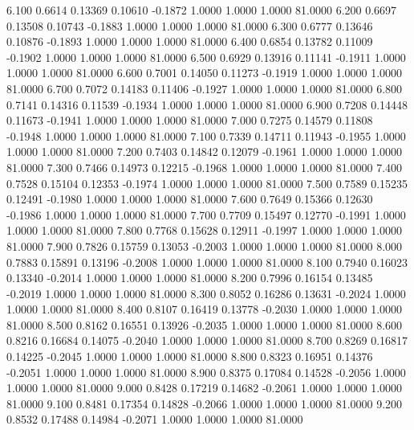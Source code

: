    6.100   0.6614   0.13369   0.10610  -0.1872   1.0000   1.0000   1.0000  81.0000
   6.200   0.6697   0.13508   0.10743  -0.1883   1.0000   1.0000   1.0000  81.0000
   6.300   0.6777   0.13646   0.10876  -0.1893   1.0000   1.0000   1.0000  81.0000
   6.400   0.6854   0.13782   0.11009  -0.1902   1.0000   1.0000   1.0000  81.0000
   6.500   0.6929   0.13916   0.11141  -0.1911   1.0000   1.0000   1.0000  81.0000
   6.600   0.7001   0.14050   0.11273  -0.1919   1.0000   1.0000   1.0000  81.0000
   6.700   0.7072   0.14183   0.11406  -0.1927   1.0000   1.0000   1.0000  81.0000
   6.800   0.7141   0.14316   0.11539  -0.1934   1.0000   1.0000   1.0000  81.0000
   6.900   0.7208   0.14448   0.11673  -0.1941   1.0000   1.0000   1.0000  81.0000
   7.000   0.7275   0.14579   0.11808  -0.1948   1.0000   1.0000   1.0000  81.0000
   7.100   0.7339   0.14711   0.11943  -0.1955   1.0000   1.0000   1.0000  81.0000
   7.200   0.7403   0.14842   0.12079  -0.1961   1.0000   1.0000   1.0000  81.0000
   7.300   0.7466   0.14973   0.12215  -0.1968   1.0000   1.0000   1.0000  81.0000
   7.400   0.7528   0.15104   0.12353  -0.1974   1.0000   1.0000   1.0000  81.0000
   7.500   0.7589   0.15235   0.12491  -0.1980   1.0000   1.0000   1.0000  81.0000
   7.600   0.7649   0.15366   0.12630  -0.1986   1.0000   1.0000   1.0000  81.0000
   7.700   0.7709   0.15497   0.12770  -0.1991   1.0000   1.0000   1.0000  81.0000
   7.800   0.7768   0.15628   0.12911  -0.1997   1.0000   1.0000   1.0000  81.0000
   7.900   0.7826   0.15759   0.13053  -0.2003   1.0000   1.0000   1.0000  81.0000
   8.000   0.7883   0.15891   0.13196  -0.2008   1.0000   1.0000   1.0000  81.0000
   8.100   0.7940   0.16023   0.13340  -0.2014   1.0000   1.0000   1.0000  81.0000
   8.200   0.7996   0.16154   0.13485  -0.2019   1.0000   1.0000   1.0000  81.0000
   8.300   0.8052   0.16286   0.13631  -0.2024   1.0000   1.0000   1.0000  81.0000
   8.400   0.8107   0.16419   0.13778  -0.2030   1.0000   1.0000   1.0000  81.0000
   8.500   0.8162   0.16551   0.13926  -0.2035   1.0000   1.0000   1.0000  81.0000
   8.600   0.8216   0.16684   0.14075  -0.2040   1.0000   1.0000   1.0000  81.0000
   8.700   0.8269   0.16817   0.14225  -0.2045   1.0000   1.0000   1.0000  81.0000
   8.800   0.8323   0.16951   0.14376  -0.2051   1.0000   1.0000   1.0000  81.0000
   8.900   0.8375   0.17084   0.14528  -0.2056   1.0000   1.0000   1.0000  81.0000
   9.000   0.8428   0.17219   0.14682  -0.2061   1.0000   1.0000   1.0000  81.0000
   9.100   0.8481   0.17354   0.14828  -0.2066   1.0000   1.0000   1.0000  81.0000
   9.200   0.8532   0.17488   0.14984  -0.2071   1.0000   1.0000   1.0000  81.0000
